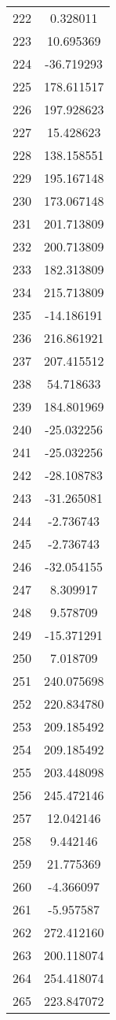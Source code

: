 \documentclass[12pt]{article}
\begin{document}
\begin{longtable}{@{}cc@{}}
222 & 0.328011 \\
223 & 10.695369 \\
224 & -36.719293 \\
225 & 178.611517 \\
226 & 197.928623 \\
227 & 15.428623 \\
228 & 138.158551 \\
229 & 195.167148 \\
230 & 173.067148 \\
231 & 201.713809 \\
232 & 200.713809 \\
233 & 182.313809 \\
234 & 215.713809 \\
235 & -14.186191 \\
236 & 216.861921 \\
237 & 207.415512 \\
238 & 54.718633 \\
239 & 184.801969 \\
240 & -25.032256 \\
241 & -25.032256 \\
242 & -28.108783 \\
243 & -31.265081 \\
244 & -2.736743 \\
245 & -2.736743 \\
246 & -32.054155 \\
247 & 8.309917 \\
248 & 9.578709 \\
249 & -15.371291 \\
250 & 7.018709 \\
251 & 240.075698 \\
252 & 220.834780 \\
253 & 209.185492 \\
254 & 209.185492 \\
255 & 203.448098 \\
256 & 245.472146 \\
257 & 12.042146 \\
258 & 9.442146 \\
259 & 21.775369 \\
260 & -4.366097 \\
261 & -5.957587 \\
262 & 272.412160 \\
263 & 200.118074 \\
264 & 254.418074 \\
265 & 223.847072 \\

\end{longtable}
\end{document}

